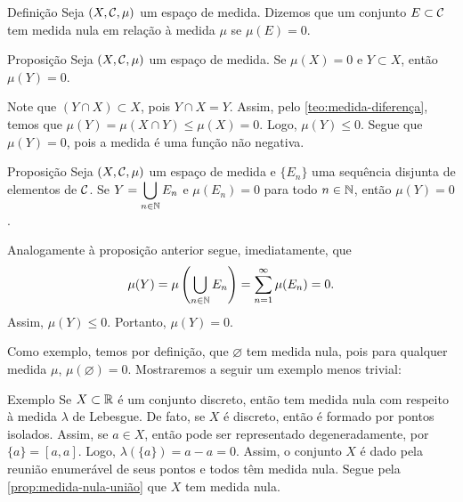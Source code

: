 \begin{env}{Definição}
	\label{def:conjunto-medida-nula}
	Seja $(X, \operatorname{\mathcal{C}}, \mu)$ um espaço de medida.
	Dizemos que um conjunto $E \subset \operatorname{\mathcal{C}}$ tem medida nula em relação à medida $\mu$ se $\mu(E) = 0$.
\end{env}

\begin{env}{Proposição}
	\label{prop:medida-nula-subconjunto}
	Seja $(X, \operatorname{\mathcal{C}}, \mu)$ um espaço de medida.
	Se $\mu(X) = 0$ e $Y \subset X$, então $\mu(Y) = 0$.
	\vspace{-1cm}
\end{env}
\begin{prova}
	Note que $(Y \cap X) \subset X$, pois $ Y \cap X = Y$.
	Assim, pelo \ref{teo:medida-diferença}, temos que
	$
	\mu(Y) = \mu(X \cap Y) \leq \mu(X) = 0
	$.
	Logo, $\mu(Y) \leq 0$.
	Segue que $\mu(Y) = 0$, pois a medida é uma função não negativa.
	\vspace{-0.4cm}
\end{prova}

\begin{env}{Proposição}
	\label{prop:medida-nula-união}
	Seja $(X, \operatorname{\mathcal{C}}, \mu)$ um espaço de medida e $\{E_n\}$ uma sequência disjunta de elementos de $\operatorname{\mathcal{C}}$.
	Se $Y = \displaystyle\bigcup_{n \in \operatorname{\mathbb{N}}}E_n$ e $\mu(E_n) = 0$ para todo $n \in \operatorname{\mathbb{N}}$, então $\mu(Y) = 0$.
\end{env}
\begin{prova}
	Analogamente à proposição anterior segue, imediatamente, que
	$$
	\mu(Y)
	=
	\mu\left(\bigcup_{n \in \operatorname{\mathbb{N}}}E_n\right)
	=
	\sum_{n = 1}^\infty \mu(E_n)
	= 0.
	$$
	Assim,
	$\mu(Y)\leq 0$. Portanto, $\mu(Y) = 0$.
\end{prova}

Como exemplo, temos por definição, que $\varnothing$ tem medida nula, pois para qualquer medida $\mu$, $\mu(\varnothing) = 0$.
Mostraremos a seguir um exemplo menos trivial:

\begin{env}{Exemplo}
	Se $X \subset \mathbb{R}$ é um conjunto discreto, então tem medida nula com respeito à medida $\lambda$ de Lebesgue.
	De fato, se $X$ é discreto, então é formado por pontos isolados.
	Assim, se $a \in X$, então pode ser representado degeneradamente, por 
	$\{a\} = [a,a]$.
	Logo, $\lambda(\{a\}) = a - a = 0$.
	Assim, o conjunto $X$ é dado pela reunião enumerável de seus pontos e todos têm medida nula. 
	Segue pela \ref{prop:medida-nula-união} que $X$ tem medida nula.
\end{env}


 

